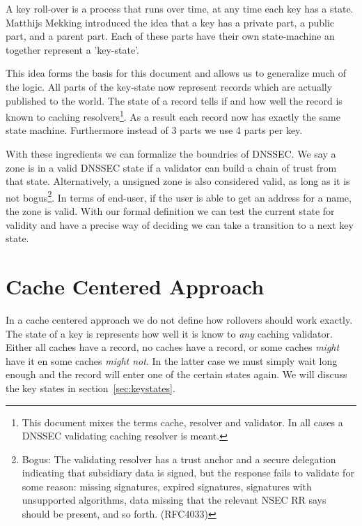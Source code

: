 \documentclass[twoside, a4paper]{article}
\begin{document}
A key roll-over is a process that runs over time, at any time each 
key has a state. Matthijs Mekking introduced the idea\cite{mekking} that a key has 
a private part, a public part, and a parent part. Each of these 
parts have their own state-machine an together represent a 
'key-state'.

This idea forms the basis for this document and 
allows us to generalize much of the logic. All parts of the 
key-state now represent records which are actually published to the 
world. The state of a record tells if and how well the record is 
known to caching resolvers\footnote{ This document mixes the 
terms cache, resolver and validator. In all cases a DNSSEC 
validating caching resolver is meant.}. As a result each record now 
has exactly the same state machine. Furthermore instead of 3 parts 
we use 4 parts per key.

With these ingredients we can formalize the boundries of DNSSEC. We say 
a zone is in a valid DNSSEC state if a validator can build a chain of 
trust from that state. Alternatively, a unsigned zone is also considered
valid, as long as it is not bogus\footnote{Bogus: 
		The validating resolver has a trust anchor and a secure
	  delegation indicating that subsidiary data is signed, but the 
	  response fails to validate for some reason: missing 
	  signatures, expired signatures, signatures with unsupported 
	  algorithms, data missing that the relevant NSEC RR says should 
	  be present, and so forth. (RFC4033) }. In terms of end-user, 
	  if the user is able to get an address for
a name, the zone is valid. With our formal definition we can test the
current state for validity and have a precise way of deciding we can
take a transition to a next key state.

\section{Cache Centered Approach}

In a cache centered approach we do not define how rollovers should 
work exactly. The state of a key is represents how well it is know 
to \emph{any} caching validator. Either all caches have a record, no 
caches have a record, or some caches \emph{might} have it en some 
caches \emph{might not}. In the latter case we must simply wait long 
enough and the record will enter one of the certain states again. We 
will discuss the key states in section~\ref{sec:keystates}.
\end{document}
